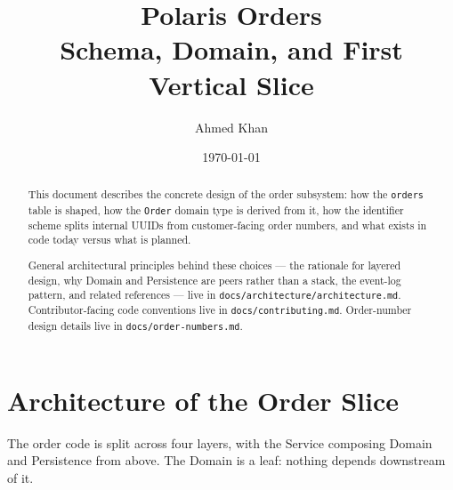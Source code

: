 \documentclass[11pt]{article}
\title{\textbf{Polaris Orders}\\\large Schema, Domain, and First Vertical Slice}
\author{Ahmed Khan}
\date{\today}
\begin{document}
\maketitle

\begin{abstract}
\noindent This document describes the concrete design of the order subsystem: how the \texttt{orders} table is shaped, how the \texttt{Order} domain type is derived from it, how the identifier scheme splits internal UUIDs from customer-facing order numbers, and what exists in code today versus what is planned.

General architectural principles behind these choices --- the rationale for layered design, why Domain and Persistence are peers rather than a stack, the event-log pattern, and related references --- live in \texttt{docs/architecture/architecture.md}. Contributor-facing code conventions live in \texttt{docs/contributing.md}. Order-number design details live in \texttt{docs/order-numbers.md}.
\end{abstract}

\section{Architecture of the Order Slice}

The order code is split across four layers, with the Service composing Domain and Persistence from above. The Domain is a leaf: nothing depends downstream of it.
\end{document}
